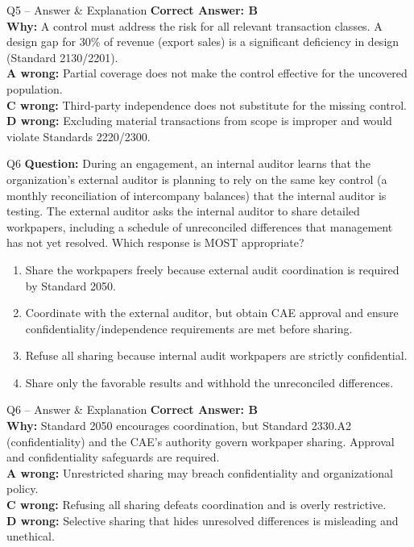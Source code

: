 \documentclass[aspectratio=169,10pt]{beamer}
\begin{document}
	\begin{frame}[t]{Q5 -- Answer \& Explanation}
		\small
		\textbf{Correct Answer: B} \\[4pt]
		\textbf{Why:} A control must address the risk for all relevant transaction classes. A design gap for 30\% of revenue (export sales) is a significant deficiency in design (Standard 2130/2201). \\[4pt]
		\textbf{A wrong:} Partial coverage does not make the control effective for the uncovered population. \\[2pt]
		\textbf{C wrong:} Third-party independence does not substitute for the missing control. \\[2pt]
		\textbf{D wrong:} Excluding material transactions from scope is improper and would violate Standards 2220/2300.
	\end{frame}
	
	\begin{frame}[t]{Q6}
		\small
		\textbf{Question:} During an engagement, an internal auditor learns that the organization's external auditor is planning to rely on the same key control (a monthly reconciliation of intercompany balances) that the internal auditor is testing. The external auditor asks the internal auditor to share detailed workpapers, including a schedule of unreconciled differences that management has not yet resolved. Which response is MOST appropriate?
		\begin{enumerate}[label=\Alph*.,itemsep=1pt,topsep=2pt]
			\item Share the workpapers freely because external audit coordination is required by Standard 2050.
			\item Coordinate with the external auditor, but obtain CAE approval and ensure confidentiality/independence requirements are met before sharing.
			\item Refuse all sharing because internal audit workpapers are strictly confidential.
			\item Share only the favorable results and withhold the unreconciled differences.
		\end{enumerate}
	\end{frame}
	
	\begin{frame}[t]{Q6 -- Answer \& Explanation}
		\small
		\textbf{Correct Answer: B} \\[4pt]
		\textbf{Why:} Standard 2050 encourages coordination, but Standard 2330.A2 (confidentiality) and the CAE's authority govern workpaper sharing. Approval and confidentiality safeguards are required. \\[4pt]
		\textbf{A wrong:} Unrestricted sharing may breach confidentiality and organizational policy. \\[2pt]
		\textbf{C wrong:} Refusing all sharing defeats coordination and is overly restrictive. \\[2pt]
		\textbf{D wrong:} Selective sharing that hides unresolved differences is misleading and unethical.
	\end{frame}
	
\end{document}
